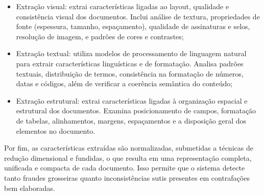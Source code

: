 \documentclass[12pt]{article}
\begin{document}
\begin{itemize}
  \item Extração visual: extrai características ligadas ao layout, qualidade e consistência visual dos documentos. Inclui análise de textura, propriedades de fonte (espessura, tamanho, espaçamento), qualidade de assinaturas e selos, resolução de imagem, e padrões de cores e contrastes;
  \item Extração textual: utiliza modelos de processamento de linguagem natural para extrair características linguísticas e de formatação. Analisa padrões textuais, distribuição de termos, consistência na formatação de números, datas e códigos, além de verificar a coerência semântica do conteúdo;
  \item Extração estrutural: extrai características ligadas à organização espacial e estrutural dos documentos. Examina posicionamento de campos, formatação de tabelas, alinhamentos, margens, espaçamentos e a disposição geral dos elementos no documento.
\end{itemize}

Por fim, as características extraídas são normalizadas, submetidas a técnicas de redução dimensional e fundidas, o que resulta em uma representação completa, unificada e compacta de cada documento. Isso permite que o sistema detecte tanto fraudes grosseiras quanto inconsistências sutis presentes em contrafações bem elaboradas.



\end{document}
